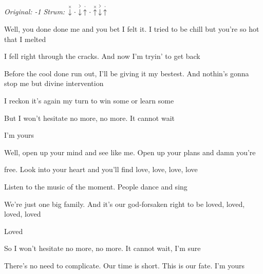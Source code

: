 \begin{song}


\begin{headerbox}
\RaiseBoxWithAccents
{} \quad
\textit{Original: -1} \quad
\textit{Strum:} $\ChuckDown\Miss\AccentDown\StaccatoUp\Miss\ChuckUp\AccentDown\StaccatoUp$
\end{headerbox}


\begin{hchordbox}
\end{hchordbox}

\bigskip

\normalsize

Well, you done done me and you bet I felt it. I tried to be chill but you're so hot that I melted \par
I fell right through the cracks. And now I'm tryin' to get back \par
Before the cool done run out, I'll be giving it my bestest. And nothin's gonna stop me but divine intervention \par
I reckon it's again my turn to win some or learn some \par

\bigskip

But I won't hesitate no more, no more. It cannot wait \par
I'm yours    \par

\bigskip

 Well, open up your mind and see like me. Open up your plans and damn you're \par
{}free. Look into your heart and you'll find love, love, love, love \par
{}Listen to the music of the moment. People dance and sing \par
We're just one big family. And it's our god-forsaken right to be loved, loved, loved, loved \par
{}Loved \par

\bigskip

So I won't hesitate no more, no more. It cannot wait, I'm sure \par
There's no need to complicate. Our time is short. This is our fate. I'm yours \par


\end{song}
